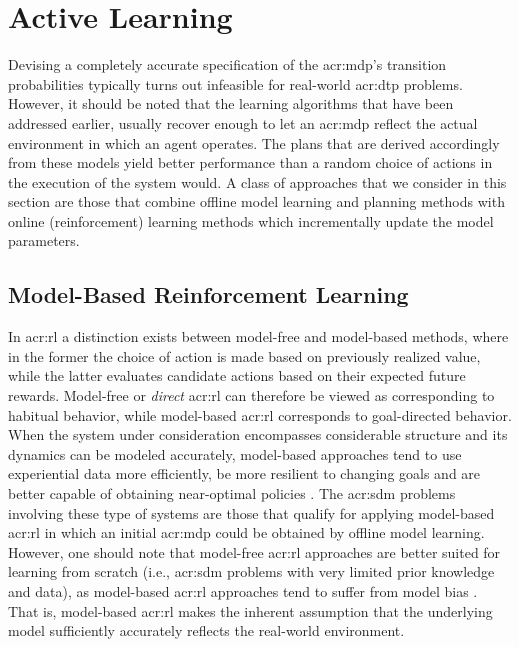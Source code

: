 \section{Active Learning}
\label{sec:active-learning}

Devising a completely accurate specification of the \acrshort{acr:mdp}'s transition probabilities typically turns out infeasible for real-world \acrshort{acr:dtp} problems.
However, it should be noted that the learning algorithms that have been addressed earlier, usually recover enough to let an \acrshort{acr:mdp} reflect the actual environment in which an agent operates.
The plans that are derived accordingly from these models yield better performance than a random choice of actions in the execution of the system would.
A class of approaches that we consider in this section are those that combine offline model learning and planning methods with online (reinforcement) learning methods which incrementally update the model parameters.

\subsection{Model-Based Reinforcement Learning}
\label{sec:model-based-reinforcement-learning}

In \acrshort{acr:rl} a distinction exists between model-free and model-based methods, where in the former the choice of action is made based on previously realized value, while the latter evaluates candidate actions based on their expected future rewards.
Model-free or \textit{direct} \acrshort{acr:rl} can therefore be viewed as corresponding to habitual behavior, while model-based \acrshort{acr:rl} corresponds to goal-directed behavior.
When the system under consideration encompasses considerable structure and its dynamics can be modeled accurately, model-based approaches tend to use experiential data more efficiently, be more resilient to changing goals and are better capable of obtaining near-optimal policies \cite{atkeson1997}.
The \acrshort{acr:sdm} problems involving these type of systems are those that qualify for applying model-based \acrshort{acr:rl} in which an initial \acrshort{acr:mdp} could be obtained by offline model learning.
However, one should note that model-free \acrshort{acr:rl} approaches are better suited for learning from scratch (i.e., \acrshort{acr:sdm} problems with very limited prior knowledge and data), as model-based \acrshort{acr:rl} approaches tend to suffer from model bias \cite{deisenroth2011pilco}.
That is, model-based \acrshort{acr:rl} makes the inherent assumption that the underlying model sufficiently accurately reflects the real-world environment.

